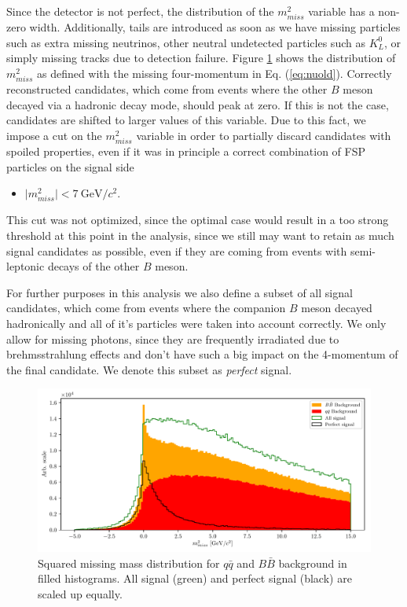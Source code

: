 \documentclass[headings=standardclasses,headings=big,oneside,a4paper,openany,12pt]{scrbook}
\newcommand {\e}[1]{\mathrm{~#1}}
\begin{document}
Since the detector is not perfect, the distribution of the $m_{miss}^2$ variable has a non-zero width. Additionally, tails are introduced as soon as we have missing particles such as extra missing neutrinos, other neutral undetected particles such as $K_L^0$, or simply missing tracks due to detection failure. Figure \ref{fig:missm2} shows the distribution of $m_{miss}^2$ as defined with the missing four-momentum in Eq. (\ref{eq:nuold}). Correctly reconstructed candidates, which come from events where the other $B$ meson decayed via a hadronic decay mode, should peak at zero. If this is not the case, candidates are shifted to larger values of this variable. Due to this fact, we impose a cut on the $m_{miss}^2$ variable in order to partially discard candidates with spoiled properties, even if it was in principle a correct combination of FSP particles on the signal side
\begin{itemize}
\item $\vert m_{miss}^2 \vert < 7\e{GeV}/c^2$.
\end{itemize}
This cut was not optimized, since the optimal case would result in a too strong threshold at this point in the analysis, since we still may want to retain as much signal candidates as possible, even if they are coming from events with semi-leptonic decays of the other $B$ meson.

For further purposes in this analysis we also define a subset of all signal candidates, which come from events where the companion $B$ meson decayed hadronically and all of it's particles were taken into account correctly. We only allow for missing photons, since they are frequently irradiated due to brehmsstrahlung effects and don't have such a big impact on the 4-momentum of the final candidate. We denote this subset as \textit{perfect} signal.

\begin{figure}[H]
\centering
\captionsetup{width=.8\linewidth}
\includegraphics[width=\linewidth]{fig/missM2}
\caption{Squared missing mass distribution for $q \bar q$ and $B \bar B$ background in filled histograms. All signal (green) and perfect signal (black) are scaled up equally.}
\label{fig:missm2}
\end{figure}
\end{document}
